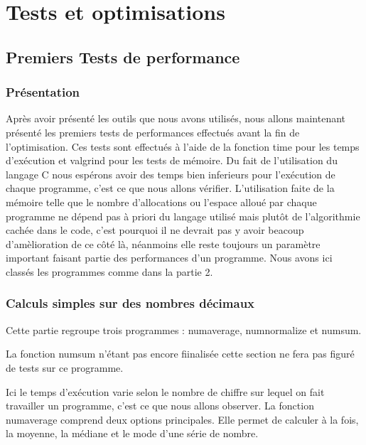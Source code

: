 
\chapter{Tests et optimisations}
\label{chap:tests et optimisations}

\section{Premiers Tests de performance}

\subsection{Présentation}

Après avoir présenté les outils que nous avons utilisés, nous allons maintenant présenté les premiers tests de performances effectués avant la fin de l'optimisation.
Ces tests sont effectués à l'aide de la fonction time pour les temps d'exécution et valgrind pour les tests de mémoire.
Du fait de l'utilisation du langage C nous espérons avoir des temps bien inferieurs pour l'exécution de chaque programme, c'est ce que nous allons vérifier.
L'utilisation faite de la mémoire telle que le nombre d'allocations ou l'espace alloué par chaque programme ne dépend pas à priori du langage utilisé mais plutôt de l'algorithmie cachée dans le code, c'est pourquoi il ne devrait pas y avoir beacoup d'amèlioration de ce côté là,
néanmoins elle reste toujours un paramètre important faisant partie des performances d'un programme.
Nous avons ici classés les programmes comme dans la partie 2.

\subsection{Calculs simples sur des nombres d\'ecimaux}

Cette partie regroupe trois programmes : numaverage, numnormalize et numsum.
\newline

La fonction numsum n'étant pas encore fiinalisée cette section ne fera pas figuré de tests sur ce programme.
\newline

Ici le temps d'exécution varie selon le nombre de chiffre sur lequel on fait travailler un programme, c'est ce que nous allons observer.
La fonction numaverage comprend deux options principales. Elle permet de calculer à la fois, la moyenne, la médiane et le mode d'une série de nombre.
\newline

